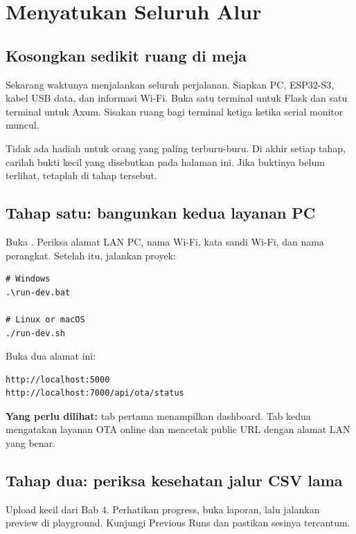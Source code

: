 \chapter{Menyatukan Seluruh Alur}

\section{Kosongkan sedikit ruang di meja}

Sekarang waktunya menjalankan seluruh perjalanan. Siapkan PC, ESP32-S3, kabel USB data, dan informasi Wi-Fi. Buka satu terminal untuk Flask dan satu terminal untuk Axum. Sisakan ruang bagi terminal ketiga ketika serial monitor muncul.

Tidak ada hadiah untuk orang yang paling terburu-buru. Di akhir setiap tahap, carilah bukti kecil yang disebutkan pada halaman ini. Jika buktinya belum terlihat, tetaplah di tahap tersebut.

\section{Tahap satu: bangunkan kedua layanan PC}

Buka . Periksa alamat LAN PC, nama Wi-Fi, kata sandi Wi-Fi, dan nama perangkat. Setelah itu, jalankan proyek:

\begin{lstlisting}[numbers=none]
# Windows
.\run-dev.bat

# Linux or macOS
./run-dev.sh
\end{lstlisting}

Buka dua alamat ini:

\begin{lstlisting}[numbers=none]
http://localhost:5000
http://localhost:7000/api/ota/status
\end{lstlisting}

\textbf{Yang perlu dilihat:} tab pertama menampilkan dashboard. Tab kedua mengatakan layanan OTA online dan mencetak public URL dengan alamat LAN yang benar.

\section{Tahap dua: periksa kesehatan jalur CSV lama}

Upload  kecil dari Bab 4. Perhatikan progress, buka laporan, lalu jalankan preview di playground. Kunjungi Previous Runs dan pastikan sesinya tercantum.

